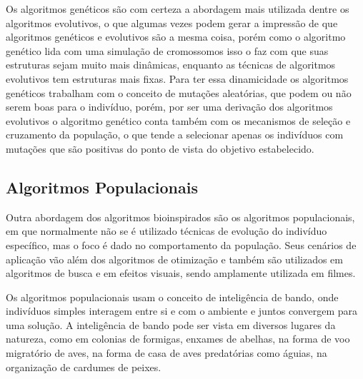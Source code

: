         Os algoritmos genéticos são com certeza a abordagem mais utilizada dentre os algoritmos evolutivos, o que algumas vezes podem gerar a impressão de que algoritmos genéticos e evolutivos são a mesma coisa, porém como o algoritmo genético lida com uma simulação de cromossomos isso o faz com que suas estruturas sejam muito mais dinâmicas, enquanto as técnicas de algoritmos evolutivos tem estruturas mais fixas.\newline
        Para ter essa dinamicidade os algoritmos genéticos trabalham com o conceito de mutações aleatórias, que podem ou não serem boas para o indivíduo, porém, por ser uma derivação dos algoritmos evolutivos o algoritmo genético conta também com os mecanismos de seleção e cruzamento da população, o que tende a selecionar apenas os indivíduos com mutações que são positivas do ponto de vista do objetivo estabelecido.


    \subsection{Algoritmos Populacionais}
        Outra abordagem dos algoritmos bioinspirados são os algoritmos populacionais, em que normalmente não se é utilizado técnicas de evolução do indivíduo específico, mas o foco é dado no comportamento da população.\newline
        Seus cenários de aplicação vão além dos algoritmos de otimização e também são utilizados em algoritmos de busca e em efeitos visuais, sendo amplamente utilizada em filmes. \newline
        
        Os algoritmos populacionais usam o conceito de inteligência de bando, onde indivíduos simples interagem entre si e com o ambiente e juntos convergem para uma solução.\newline
        A inteligência de bando pode ser vista em diversos lugares da natureza, como em colonias de formigas, enxames de abelhas, na forma de voo migratório de aves, na forma de casa de aves predatórias como águias, na organização de cardumes de peixes.\newline

